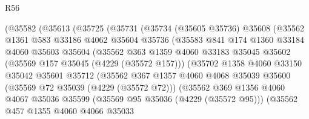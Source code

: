 \begin{lexlean}{R56}
\begin{coremodule}
                    (@35582
                      (@35613
                        (@35725
                          (@35731
                            (@35734
                              (@35605 @35736)
                              @35608
                              (@35562
                                @1361
                                @583
                                @33186
                                @4062
                                @35604
                                @35736
                                (@35583
                                  @841
                                  @174
                                  @1360
                                  @33184
                                  @4060
                                  @35603
                                  @35604
                                  (@35562
                                    @363
                                    @1359
                                    @4060
                                    @33183
                                    @35045
                                    @35602
                                    (@35569 @157 @35045 (@4229 (@35572 @157)))
                                    (@35702
                                      @1358
                                      @4060
                                      @33150
                                      @35042
                                      @35601
                                      @35712
                                      (@35562
                                        @367
                                        @1357
                                        @4060
                                        @4068
                                        @35039
                                        @35600
                                        (@35569 @72 @35039 (@4229 (@35572 @72)))
                                        (@35562
                                          @369
                                          @1356
                                          @4060
                                          @4067
                                          @35036
                                          @35599
                                          (@35569 @95 @35036 (@4229 (@35572 @95)))
                                          (@35562
                                            @457
                                            @1355
                                            @4060
                                            @4066
                                            @35033

\end{coremodule}
\end{lexlean}
